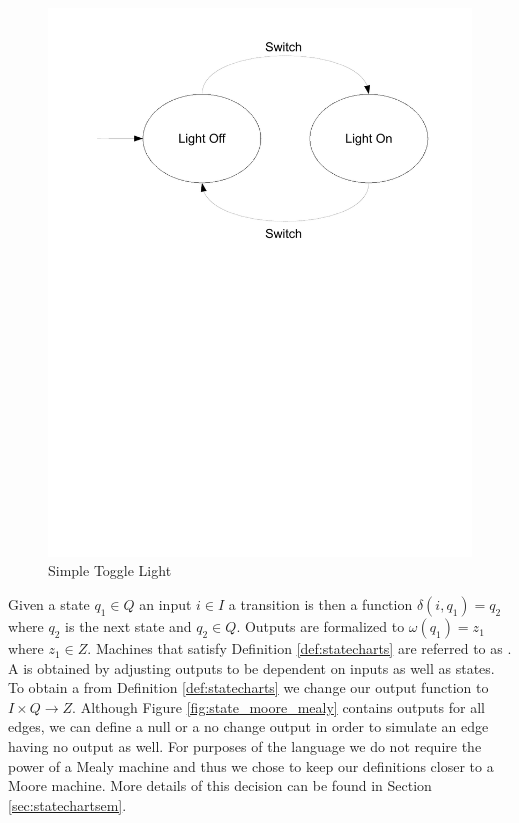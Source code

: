 \begin{figure}[htp]
    \centering
    \includegraphics[trim= 10mm 150mm 10mm 10mm, clip, width=\imgmedium]{./images/state_blink_light.pdf}
    \caption{Simple Toggle Light}
    \label{fig:state_blink_light}
\end{figure}

Given a state $q_1 \in Q$ an input $i \in I$ a transition is then a function $\delta(i,q_1) = q_2$ where $q_2$ is the next state and $q_2 \in Q$.  Outputs are formalized to $\omega(q_1)=z_1$ where $z_1 \in Z$. Machines that satisfy Definition \ref{def:statecharts} are referred to as \cite{booth}. A  is obtained by adjusting outputs to be dependent on inputs as well as states. To obtain a  from Definition \ref{def:statecharts} we change our output function to $I \times Q \rightarrow Z$. Although Figure \ref{fig:state_moore_mealy} contains outputs for all edges, we can define a null or a no change output in order to simulate an edge having no output as well. For purposes of the \plccharts language we do not require the power of a Mealy machine and thus we chose to keep our definitions closer to a Moore machine. More details of this decision can be found in Section \ref{sec:statechartsem}.

